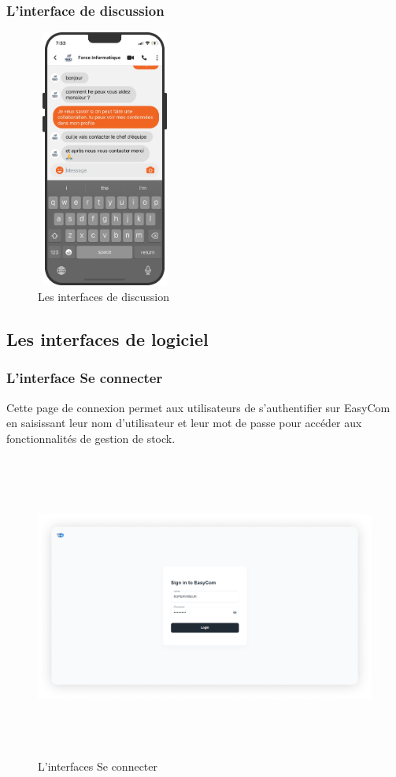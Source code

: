\documentclass[edit,12pt,a4paper,ChapStyle,oneside,doubleinterligne]{report}
\begin{document}
\subsubsection{L'interface de discussion}
  \begin{figure} [H]
    \centering
    \includegraphics[width=4.5cm , height = 8.5cm , angle=360]{images/app discussiion.png}
    \caption{Les interfaces de discussion}
    \label{fig:colors}
\end{figure}



\subsection{Les interfaces de logiciel}
\subsubsection{L'interface Se connecter}
Cette page de connexion permet aux utilisateurs de s'authentifier sur EasyCom en saisissant leur nom d'utilisateur et leur mot de passe pour accéder aux fonctionnalités de gestion de stock.
  \begin{figure} [H]
    \centering
    \includegraphics[width = 15.319375cm , height = 10cm , angle=360]{images/sign in 1.png}
    \caption{L'interfaces Se connecter}
    \label{fig:se connecter}
\end{figure}
\end{document}
